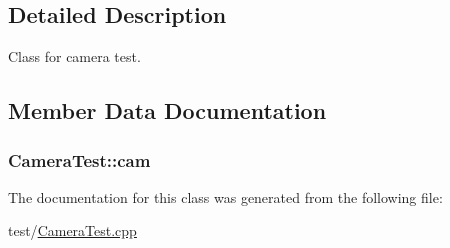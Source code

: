 \subsection{Detailed Description}
Class for camera test. 

\subsection{Member Data Documentation}
\subsubsection[{\texorpdfstring{cam}{cam}}]{ Camera\+Test\+::cam\hspace{0.3cm}{\ttfamily [protected]}}\hypertarget{class_camera_test_a76aa7e4350e4b5773e5641ffa837b100}{}\label{class_camera_test_a76aa7e4350e4b5773e5641ffa837b100}


The documentation for this class was generated from the following file\+:\begin{DoxyCompactItemize}
\item 
test/\hyperlink{_camera_test_8cpp}{Camera\+Test.\+cpp}\end{DoxyCompactItemize}
